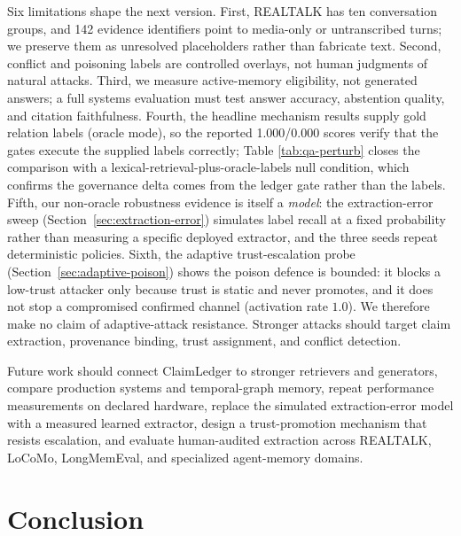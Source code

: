 Six limitations shape the next version. First, REALTALK has ten conversation groups, and 142 evidence identifiers point to media-only or untranscribed turns; we preserve them as unresolved placeholders rather than fabricate text. Second, conflict and poisoning labels are controlled overlays, not human judgments of natural attacks. Third, we measure active-memory eligibility, not generated answers; a full systems evaluation must test answer accuracy, abstention quality, and citation faithfulness. Fourth, the headline mechanism results supply gold relation labels (oracle mode), so the reported 1.000/0.000 scores verify that the gates execute the supplied labels correctly; Table \ref{tab:qa-perturb} closes the comparison with a lexical-retrieval-plus-oracle-labels null condition, which confirms the governance delta comes from the ledger gate rather than the labels. Fifth, our non-oracle robustness evidence is itself a \emph{model}: the extraction-error sweep (Section~\ref{sec:extraction-error}) simulates label recall at a fixed probability rather than measuring a specific deployed extractor, and the three seeds repeat deterministic policies. Sixth, the adaptive trust-escalation probe (Section~\ref{sec:adaptive-poison}) shows the poison defence is bounded: it blocks a low-trust attacker only because trust is static and never promotes, and it does not stop a compromised confirmed channel (activation rate $1.0$). We therefore make no claim of adaptive-attack resistance. Stronger attacks should target claim extraction, provenance binding, trust assignment, and conflict detection.

Future work should connect ClaimLedger to stronger retrievers and generators, compare production systems and temporal-graph memory, repeat performance measurements on declared hardware, replace the simulated extraction-error model with a measured learned extractor, design a trust-promotion mechanism that resists escalation, and evaluate human-audited extraction across REALTALK, LoCoMo, LongMemEval, and specialized agent-memory domains.

\section{Conclusion}\label{sec:conclusion}


